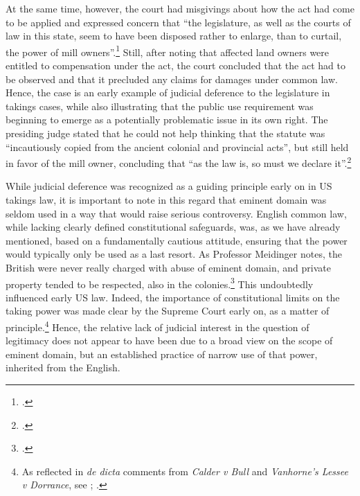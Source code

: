 \documentclass[12pt,a4paper]{book} %
\begin{document}
At the same time, however, the court had misgivings about how the act had come to be applied and expressed concern that ``the legislature, as well as the courts of law in this state, seem to have been disposed rather to enlarge, than to curtail, the power of mill owners''.\footcite[366]{stowell14} Still, after noting that affected land owners were entitled to compensation under the act, the court concluded that the act had to be observed and that it precluded any claims for damages under common law. Hence, the case is an early example of judicial deference to the legislature in takings cases, while also illustrating that the public use requirement was beginning to emerge as a potentially problematic issue in its own right. The presiding judge stated that he could not help thinking that the statute was ``incautiously copied from the ancient colonial and provincial acts'', but still held in favor of the mill owner,  concluding that ``as the law is, so must we declare it''.\footcite[368]{stowell14}

While judicial deference was recognized as a guiding principle early on in US takings law, it is important to note in this regard that eminent domain was seldom used in a way that would raise serious controversy. English common law, while lacking clearly defined constitutional safeguards, was, as we have already mentioned, based on a fundamentally cautious attitude, ensuring that the power would typically only be used as a last resort. As Professor Meidinger notes, the British were never really charged with abuse of eminent domain, and private property tended to be respected, also in the colonies.\footcite[17]{meidinger80} This undoubtedly influenced early US law. Indeed, the importance of constitutional limits on the taking power was made clear by the Supreme Court early on, as a matter of principle.\footnote{As reflected in {\it de dicta} comments from {\it Calder v Bull} and {\it Vanhorne’s Lessee v Dorrance}, see \cite[388]{calder98}; \cite[310]{vanhorne95}.} Hence, the relative lack of judicial interest in the question of legitimacy does not appear to have been due to a broad view on the scope of eminent domain, but an established practice of narrow use of that power, inherited from the English.
\end{document}
